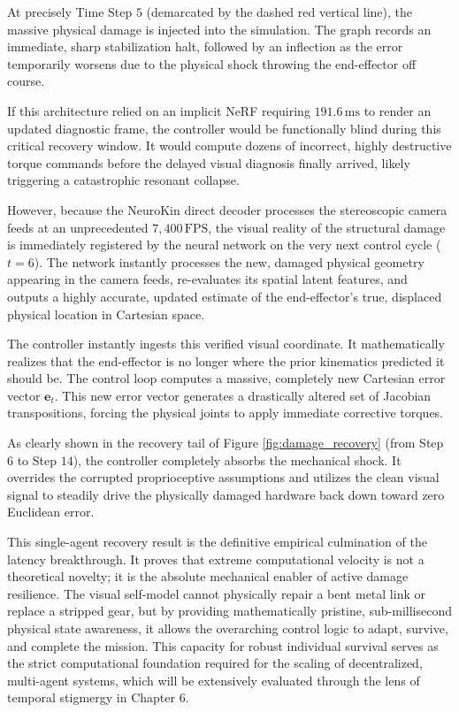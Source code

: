 \documentclass[12pt,a4paper,oneside]{report}
\begin{document}
At precisely Time Step $5$ (demarcated by the dashed red vertical line), the massive physical damage is injected into the simulation. The graph records an immediate, sharp stabilization halt, followed by an inflection as the error temporarily worsens due to the physical shock throwing the end-effector off course. 

If this architecture relied on an implicit NeRF requiring $191.6\,\mathrm{ms}$ to render an updated diagnostic frame, the controller would be functionally blind during this critical recovery window. It would compute dozens of incorrect, highly destructive torque commands before the delayed visual diagnosis finally arrived, likely triggering a catastrophic resonant collapse. 

However, because the NeuroKin direct decoder processes the stereoscopic camera feeds at an unprecedented $7{,}400\,\mathrm{FPS}$, the visual reality of the structural damage is immediately registered by the neural network on the very next control cycle ($t=6$). The network instantly processes the new, damaged physical geometry appearing in the camera feeds, re-evaluates its spatial latent features, and outputs a highly accurate, updated estimate of the end-effector's true, displaced physical location in Cartesian space.

The controller instantly ingests this verified visual coordinate. It mathematically realizes that the end-effector is no longer where the prior kinematics predicted it should be. The control loop computes a massive, completely new Cartesian error vector $\mathbf{e}_t$. This new error vector generates a drastically altered set of Jacobian transpositions, forcing the physical joints to apply immediate corrective torques. 

As clearly shown in the recovery tail of Figure \ref{fig:damage_recovery} (from Step $6$ to Step $14$), the controller completely absorbs the mechanical shock. It overrides the corrupted proprioceptive assumptions and utilizes the clean visual signal to steadily drive the physically damaged hardware back down toward zero Euclidean error. 

This single-agent recovery result is the definitive empirical culmination of the latency breakthrough. It proves that extreme computational velocity is not a theoretical novelty; it is the absolute mechanical enabler of active damage resilience. The visual self-model cannot physically repair a bent metal link or replace a stripped gear, but by providing mathematically pristine, sub-millisecond physical state awareness, it allows the overarching control logic to adapt, survive, and complete the mission. This capacity for robust individual survival serves as the strict computational foundation required for the scaling of decentralized, multi-agent systems, which will be extensively evaluated through the lens of temporal stigmergy in Chapter 6.
\end{document}
